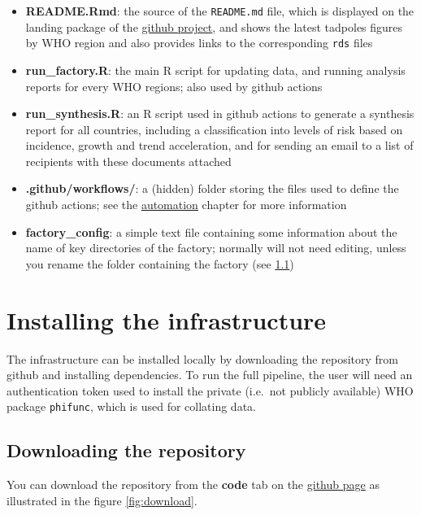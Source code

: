 \documentclass[]{book}
\begin{document}
\begin{itemize}
\item
  \textbf{README.Rmd}: the source of the \texttt{README.md} file, which is displayed on the
  landing package of the \href{https://github.com/whocov/trend_analysis_public}{github project},
  and shows the latest tadpoles figures by WHO region and also provides links to
  the corresponding \texttt{rds} files
\item
  \textbf{run\_factory.R}: the main R script for updating data, and running analysis
  reports for every WHO regions; also used by github actions
\item
  \textbf{run\_synthesis.R}: an R script used in github actions to generate a synthesis
  report for all countries, including a classification into levels of risk based
  on incidence, growth and trend acceleration, and for sending an email to a list of
  recipients with these documents attached
\item
  \textbf{.github/workflows/}: a (hidden) folder storing the files used to define the
  github actions; see the \protect\hyperlink{automation}{automation} chapter for more information
\item
  \textbf{factory\_config}: a simple text file containing some information about the
  name of key directories of the factory; normally will not need editing, unless
  you rename the folder containing the factory (see \ref{downloading})
\end{itemize}

\hypertarget{installing-the-infrastructure}{%
\section{Installing the infrastructure}\label{installing-the-infrastructure}}

The infrastructure can be installed locally by downloading the repository from
github and installing dependencies. To run the full pipeline, the user will need
an authentication token used to install the private (i.e.~not publicly
available) WHO package \texttt{phifunc}, which is used for collating data.

\hypertarget{downloading}{%
\subsection{Downloading the repository}\label{downloading}}

You can download the repository from the \textbf{code} tab on the
\href{https://github.com/whocov/trend_analysis_public}{github page}
as illustrated in the figure \ref{fig:download}.
\end{document}
